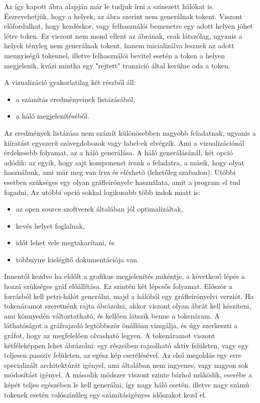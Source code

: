 Az így kapott ábra alapján már le tudjuk írni a színezett hálókat is. Észrevehetjük, hogy a helyek, az ábra szerint nem generálnak tokent. Viszont előfordulhat, hogy kezdéskor, vagy felhasználói bemenetre egy adott helyen jöhet létre token. Ez viszont nem mond ellent az ábrának, csak látszólag, ugyanis a helyek tényleg nem generálnak tokent, hanem inicializálva lesznek az adott mennyiségű tokennel, illetve felhasználói bevitel esetén a token a helyen megjelenik, kvázi mintha egy "rejtett" tranzició által kerülne oda a token. 

A vizualizáció gyakorlatilag két részből áll:
\begin{itemize}
\item a számítás eredményeinek listázásából,
\item a háló megjelenítéséből. 
\end{itemize}
Az eredmények listázása nem számít különösebben nagyobb feladatnak, ugyanis a kiíratást egyszerű szövegdobozok vagy label-ek elvégzik. Ami a vizualizációnál érdekesebb folyamat, az a háló generálása. 
A háló generálásánál, két opció adódik: az egyik, hogy sajt komponenst írunk a feladatra, a másik, hogy olyat használunk, ami már meg van írva és elérhető (lehetőleg szabadon). Utóbbi esetben szükséges egy olyan gráfleírónyelv használata, amit a program el tud fogadni. Az utóbbi opció sokkal logikusabb több indok miatt is:
\begin{itemize}
\item az open source szoftverek általában jól optimalizáltak,
\item kevés helyet foglalnak,
\item időt lehet vele megtakarítani, és
\item többnyire kielégítő dokumentációja van.
\end{itemize}

Innentől kezdve ha eldőlt a grafikus megjelenítés mikéntje, a következő lépés a hozzá szükséges gráf előállítása. Ez szintén két lépcsős folyamat. Először a forrásból kell petri-hálót generálni, majd a hálóból egy gráfleírónyelvi verziót. Ha tokenáramot szeretnénk rajta ábrázolni, akkor viszont olyan ábrát kell készíteni, ami könnyedén változtatható, és kellően látszik benne a tokenáram. A láthatóságot a gráfrajzoló legtöbbször önállóan vizsgálja, és úgy szerkeszti a gráfot, hogy az megfelelően olvasható legyen. A tokenáramot viszont kétféleképpen lehet ábrázolni: egy részeiben rajzolható aktív felületen, vagy egy teljesen passzív felületen, az egész kép cserélésével. Az első megoldás egy erre specializált architektúrát igényel, ami általában nem ingyenes, vagy nagyon sok módosítást igényel. A második módszer viszont szinte bárhol működik, cserébe a képét teljes egészében le kell generálni, így nagy háló esetén, illetve nagy számú tokenek esetén valószínűleg egy számításigényes időszakot kezd el. 


